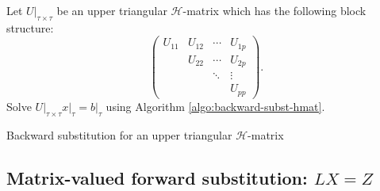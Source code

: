 \documentclass[11pt, a4paper]{book}
\begin{document}
Let $U\big\vert_{\tau\times\tau}$ be an upper triangular $\mathcal{H}$-matrix which has
the following block structure:
\begin{equation}
  \begin{pmatrix}
    U_{11} & U_{12} & \cdots & U_{1p} \\
    & U_{22} & \cdots & U_{2p} \\
    & & \ddots & \vdots \\
    & & & U_{pp}
  \end{pmatrix}.
\end{equation}
Solve $U\big\vert_{\tau\times\tau} x \big\vert_{\tau} = b \big\vert_{\tau} $ using
Algorithm \ref{algo:backward-subst-hmat}.
\begin{breakablealgorithm}
  \label{algo:backward-subst-hmat}
  \caption{Backward substitution for an upper triangular $\mathcal{H}$-matrix}
  \begin{algorithmic}[1]
      \Else
          \EndFor
        \EndFor
      \EndIf
    \EndProcedure
  \end{algorithmic}
\end{breakablealgorithm}

\subsection{Matrix-valued forward substitution: $LX = Z$}
\label{sec:forward-subst-matrix-valued}
\end{document}
